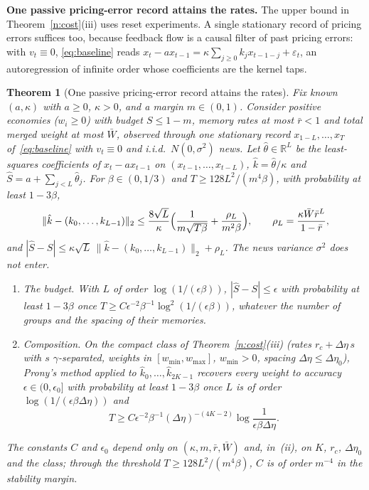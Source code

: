 \documentclass[11pt,letterpaper]{article}
\newtheorem{theorem}{Theorem}[section]
\theoremstyle{definition}
\newcommand{\R}{\mathbb{R}}
\begin{document}
\textbf{One passive pricing-error record attains the rates.} The upper bound in Theorem~\ref{n:cost}(iii) uses reset experiments. A single stationary record of pricing errors suffices too, because feedback flow is a causal filter of past pricing errors: with $v_t \equiv 0$, \eqref{eq:baseline} reads $x_t - a x_{t-1} = \kappa \sum_{j \ge 0} k_j x_{t-1-j} + \varepsilon_t$, an autoregression of infinite order whose coefficients are the kernel taps.

\begin{theorem}[One passive pricing-error record attains the rates]\label{n:passiveupper}
Fix known $(a, \kappa)$ with $a \ge 0$, $\kappa > 0$, and a margin $m \in (0, 1)$. Consider positive economies ($w_i \ge 0$) with budget $S \le 1 - m$, memory rates at most $\bar r < 1$ and total merged weight at most $\bar W$, observed through one stationary record $x_{1-L}, \dots, x_T$ of~\eqref{eq:baseline} with $v_t \equiv 0$ and i.i.d.\ $N(0, \sigma^2)$ news. Let $\hat\theta \in \R^L$ be the least-squares coefficients of $x_t - a x_{t-1}$ on $(x_{t-1}, \dots, x_{t-L})$, $\hat k = \hat\theta / \kappa$ and $\hat S = a + \sum_{j < L} \hat\theta_j$. For $\beta \in (0, 1/3)$ and $T \ge 128 L^2 / (m^4 \beta)$, with probability at least $1 - 3\beta$,
\[
  \|\hat k - (k_0, \dots, k_{L-1})\|_2 \le \frac{8\sqrt{L}}{\kappa}\Bigl(\frac{1}{m\sqrt{T\beta}} + \frac{\rho_L}{m^2 \beta}\Bigr),
  \qquad \rho_L = \frac{\kappa \bar W \bar r^L}{1 - \bar r},
\]
and $|\hat S - S| \le \kappa\sqrt{L}\, \|\hat k - (k_0, \dots, k_{L-1})\|_2 + \rho_L$. The news variance $\sigma^2$ does not enter.
\begin{enumerate}
  \item[(i)] \emph{The budget.} With $L$ of order $\log(1/(\epsilon\beta))$, $|\hat S - S| \le \epsilon$ with probability at least $1 - 3\beta$ once $T \ge C \epsilon^{-2} \beta^{-1} \log^2(1/(\epsilon\beta))$, whatever the number of groups and the spacing of their memories.
  \item[(ii)] \emph{Composition.} On the compact class of Theorem~\ref{n:cost}(iii) (rates $r_c + \Delta\eta\, s$ with $s$ $\gamma$-separated, weights in $[w_{\min}, w_{\max}]$, $w_{\min} > 0$, spacing $\Delta\eta \le \Delta\eta_0$), Prony's method applied to $\hat k_0, \dots, \hat k_{2K-1}$ recovers every weight to accuracy $\epsilon \in (0, \epsilon_0]$ with probability at least $1 - 3\beta$ once $L$ is of order $\log(1/(\epsilon\beta\Delta\eta))$ and
  \[
    T \ge C \epsilon^{-2} \beta^{-1} (\Delta\eta)^{-(4K-2)} \log\frac{1}{\epsilon\beta\Delta\eta}.
  \]
\end{enumerate}
The constants $C$ and $\epsilon_0$ depend only on $(\kappa, m, \bar r, \bar W)$ and, in~(ii), on $K$, $r_c$, $\Delta\eta_0$ and the class; through the threshold $T \ge 128 L^2/(m^4\beta)$, $C$ is of order $m^{-4}$ in the stability margin.
\end{theorem}
\end{document}
